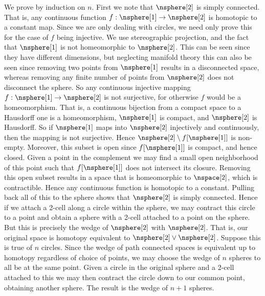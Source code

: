 \documentclass{article}                                                        %
\begin{document}
    \begin{solution}
        We prove by induction on $n$. First we note that $\nsphere[2]$ is
        simply connected. That is, any continuous function
        $f:\nsphere[1]\rightarrow\nsphere[2]$ is homotopic to a constant map.
        Since we are only dealing with circles, we need only prove this for the
        case of $f$ being injective. We use stereographic projection, and the
        fact that $\nsphere[1]$ is not homeomorphic to $\nsphere[2]$. This can
        be seen since they have different dimensions, but neglecting manifold
        theory this can also be seen since removing two points from
        $\nsphere[1]$ results in a disconnected space, whereas removing any
        finite number of points from
        $\nsphere[2]$ does not disconnect the sphere. So any continuous
        injective mapping $f:\nsphere[1]\rightarrow\nsphere[2]$ is not
        surjective, for otherwise $f$ would be a homeomorphism. That is, a
        continuous bijection from a compact space to a Hausdorff one is a
        homeomorphism, $\nsphere[1]$ is compact, and $\nsphere[2]$ is Hausdorff.
        So if $\nsphere[1]$ maps into $\nsphere[2]$ injectively and
        continuously, then the mapping is not surjective. Hence
        $\nsphere[2]\setminus{f}[\nsphere[1]]$ is non-empty. Moreover, this
        subset is open since $f[\nsphere[1]]$ is compact, and hence closed.
        Given a point in the complement we may find a small open neighborhood of
        this point such that $f[\nsphere[1]]$ does not intersect its closure.
        Removing this open subset results in a space that is homeomorphic to
        $\nspace[2]$, which is contractible. Hence any continuous function is
        homotopic to a constant. Pulling back all of this to the sphere shows
        that $\nsphere[2]$ is simply connected. Hence if we attach a 2-cell
        along a circle within the sphere, we may contract this circle to a point
        and obtain a sphere with a 2-cell attached to a point on the sphere.
        But this is precisely the wedge of $\nsphere[2]$ with $\nsphere[2]$.
        That is, our original space is homotopy equivalent to
        $\nsphere[2]\lor\nsphere[2]$. Suppose this is true of $n$ circles.
        Since the wedge of path connected spaces is equivalent up to homotopy
        regardless of choice of points, we may choose the wedge of $n$ spheres
        to all be at the same point. Given a circle in the original sphere and a
        2-cell attached to this we may then contract the circle down to our
        common point, obtaining another sphere. The result is the wedge of $n+1$
        spheres.
    \end{solution}
\end{document}
